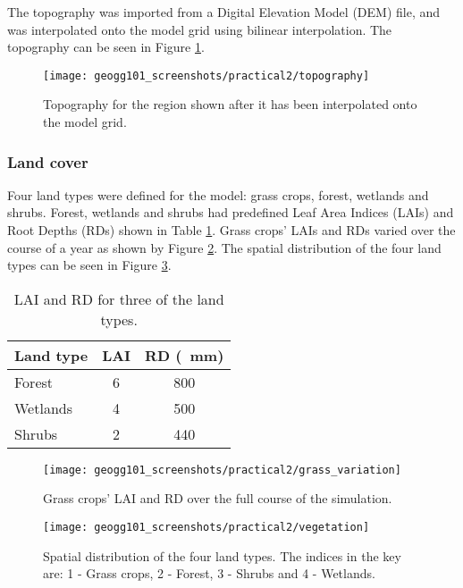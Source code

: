 \documentclass{article}
\begin{document}
The topography was imported from a Digital Elevation Model (DEM) file, and was interpolated onto the model grid using bilinear interpolation. The topography can be seen in Figure \ref{fig:topography}.

\begin{figure}[!h]
    \centering
    \texttt{[image: geogg101\_screenshots/practical2/topography]}
    \caption{Topography for the region shown after it has been interpolated onto the model grid.}
    \label{fig:topography}
\end{figure}

\subsubsection{Land cover}

Four land types were defined for the model: grass crops, forest, wetlands and shrubs. Forest, wetlands and shrubs had predefined Leaf Area Indices (LAIs) and Root Depths (RDs) shown in Table \ref{table:lai_rd}. Grass crops' LAIs and RDs varied over the course of a year as shown by Figure \ref{fig:grass_variation}. The spatial distribution of the four land types can be seen in Figure \ref{fig:vegetation}.

\setlength\extrarowheight{3pt}
\begin{table}[!h]
    \centering
    \begin{tabular}{l c c}
	Land type   & LAI & RD (\SI{}{mm}) \\
	    \hline
	    Forest & \num{6} & \num{800} \\
	    Wetlands & \num{4} & \num{500} \\
	    Shrubs & \num{2} & \num{440} \\
    \end{tabular}
    \caption{LAI and RD for three of the land types.}
    \label{table:lai_rd}
\end{table}


\begin{figure}[!h]
    \centering
    \texttt{[image: geogg101\_screenshots/practical2/grass\_variation]}
    \caption{Grass crops' LAI and RD over the full course of the simulation.}
    \label{fig:grass_variation}
\end{figure}

\begin{figure}[!h]
    \centering
    \texttt{[image: geogg101\_screenshots/practical2/vegetation]}
    \caption{Spatial distribution of the four land types. The indices in the key are: 1 - Grass crops, 2 - Forest, 3 - Shrubs and 4 - Wetlands. }
    \label{fig:vegetation}
\end{figure}
\end{document}
